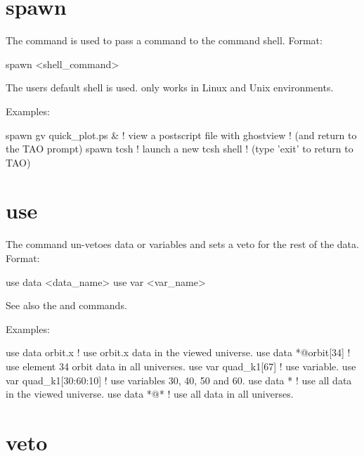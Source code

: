 {{{%
\section{spawn}
\label{s:spawn}

The  command is used to pass a command to the command shell. Format:
\begin{example}
  spawn <shell_command>
\end{example}

\vskip 0.2in

The users default shell is used.  only works in Linux and
Unix environments.

Examples:
\begin{example}
  spawn gv quick_plot.ps &      ! view a postscript file with ghostview
                                ! (and return to the TAO prompt)
  spawn tcsh                    ! launch a new tcsh shell 
                                ! (type 'exit' to return to TAO)
\end{example}

\section{use}
\label{s:use}

The  command un-vetoes data or variables and sets a veto for
the rest of the data. Format:
\begin{example}
  use data  <data_name>
  use var <var_name>
\end{example}

\vskip 0.2in 

See also the  and  commands.

Examples:
\begin{example}
  use data orbit.x             ! use orbit.x data in the viewed universe.
  use data *@orbit[34]         ! use element 34 orbit data in all universes.
  use var quad_k1[67]          ! use variable.
  use var quad_k1[30:60:10]    ! use variables 30, 40, 50 and 60.
  use data *                   ! use all data in the viewed universe.
  use data *@*                 ! use all data in all universes.
\end{example}


\section{veto}
\label{s:veto}

}}}
